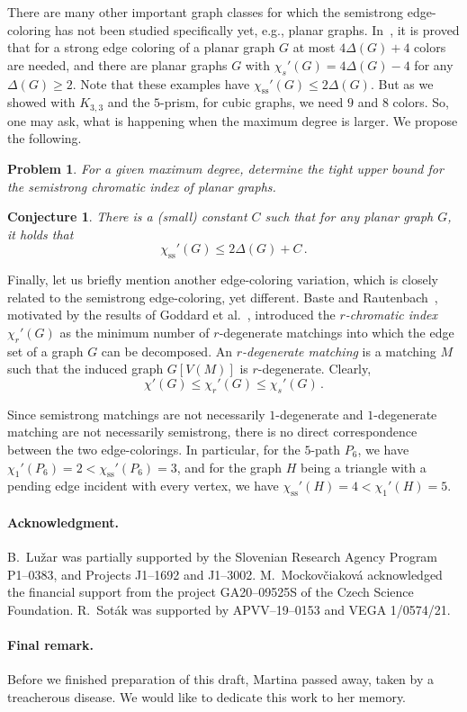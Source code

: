 \documentclass[12pt,a4paper]{article}
\newtheorem{conjecture}{Conjecture}
\newtheorem{problem}{Problem}
\newcommand{\chis}[1]{\ensuremath{\chi_{s}'(#1)}}
\newcommand{\chiss}[1]{\ensuremath{\chi_{\mathrm{ss}}'(#1)}}
\begin{document}
There are many other important graph classes for which the semistrong edge-coloring has not been studied specifically yet,
e.g., planar graphs.
In~\cite{FauGyaSchTuz90}, it is proved that for a strong edge coloring of a planar graph $G$ at most $4\Delta(G) + 4$ colors are needed, 
and there are planar graphs $G$ with $\chis{G} = 4\Delta(G) - 4$ for any $\Delta(G) \ge 2$.
Note that these examples have $\chiss{G} \le 2\Delta(G)$. But as we showed with $K_{3,3}$ and the $5$-prism, for cubic graphs, we need $9$ and $8$ colors.
So, one may ask, what is happening when the maximum degree is larger.
We propose the following.
\begin{problem}
	For a given maximum degree, determine the tight upper bound for the semistrong chromatic index of planar graphs.
\end{problem}
\begin{conjecture}
	There is a (small) constant $C$ such that for any planar graph $G$, it holds that
	$$
		\chiss{G} \le 2\Delta(G) + C\,.
	$$
\end{conjecture}

\smallskip
Finally, let us briefly mention another edge-coloring variation, 
which is closely related to the semistrong edge-coloring, yet different.
Baste and Rautenbach~\cite{BasRau18}, motivated by the results of Goddard et al.~\cite{GodHedHedLas05},
introduced the {\em $r$-chromatic index $\chi_r'(G)$} as the minimum number of $r$-degenerate matchings into which
the edge set of a graph $G$ can be decomposed. 
An {\em $r$-degenerate matching} is a matching $M$ such that the induced graph $G[V(M)]$ is $r$-degenerate.
Clearly,
$$
	\chi'(G) \le \chi_r'(G) \le \chis{G}\,.
$$

Since semistrong matchings are not necessarily $1$-degenerate 
and $1$-degenerate matching are not necessarily semistrong,
there is no direct correspondence between the two edge-colorings.
In particular,
for the $5$-path $P_6$, we have $\chi_1'(P_6) = 2 < \chiss{P_6} = 3$,
and for the graph $H$ being a triangle with a pending edge incident with every vertex,
we have $\chiss{H} = 4 < \chi_1'(H) = 5$. 


\paragraph{Acknowledgment.} 
B.~Lu\v{z}ar was partially supported by the Slovenian Research Agency Program P1--0383, and Projects J1--1692 and J1--3002.
M.~Mockov\v{c}iakov\'{a} acknowledged the financial support from the project GA20--09525S of the Czech Science Foundation.
R.~Sot\'{a}k was supported by APVV--19--0153 and VEGA 1/0574/21.

\paragraph{Final remark.} 
Before we finished preparation of this draft, Martina passed away, taken by a treacherous disease.
We would like to dedicate this work to her memory.



\end{document}
